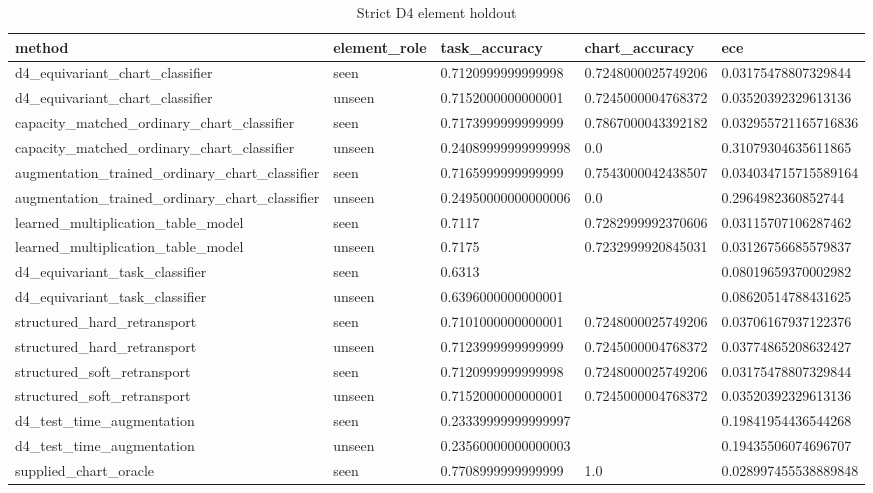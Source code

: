 \begin{table}[t]
\centering
\caption{Strict D4 element holdout}
\begin{tabular}{lllll}
\toprule
method & element\_role & task\_accuracy & chart\_accuracy & ece \\
\midrule
d4\_equivariant\_chart\_classifier & seen & 0.7120999999999998 & 0.7248000025749206 & 0.03175478807329844 \\
d4\_equivariant\_chart\_classifier & unseen & 0.7152000000000001 & 0.7245000004768372 & 0.03520392329613136 \\
capacity\_matched\_ordinary\_chart\_classifier & seen & 0.7173999999999999 & 0.7867000043392182 & 0.032955721165716836 \\
capacity\_matched\_ordinary\_chart\_classifier & unseen & 0.24089999999999998 & 0.0 & 0.31079304635611865 \\
augmentation\_trained\_ordinary\_chart\_classifier & seen & 0.7165999999999999 & 0.7543000042438507 & 0.034034715715589164 \\
augmentation\_trained\_ordinary\_chart\_classifier & unseen & 0.24950000000000006 & 0.0 & 0.2964982360852744 \\
learned\_multiplication\_table\_model & seen & 0.7117 & 0.7282999992370606 & 0.03115707106287462 \\
learned\_multiplication\_table\_model & unseen & 0.7175 & 0.7232999920845031 & 0.03126756685579837 \\
d4\_equivariant\_task\_classifier & seen & 0.6313 &  & 0.08019659370002982 \\
d4\_equivariant\_task\_classifier & unseen & 0.6396000000000001 &  & 0.08620514788431625 \\
structured\_hard\_retransport & seen & 0.7101000000000001 & 0.7248000025749206 & 0.03706167937122376 \\
structured\_hard\_retransport & unseen & 0.7123999999999999 & 0.7245000004768372 & 0.03774865208632427 \\
structured\_soft\_retransport & seen & 0.7120999999999998 & 0.7248000025749206 & 0.03175478807329844 \\
structured\_soft\_retransport & unseen & 0.7152000000000001 & 0.7245000004768372 & 0.03520392329613136 \\
d4\_test\_time\_augmentation & seen & 0.23339999999999997 &  & 0.19841954436544268 \\
d4\_test\_time\_augmentation & unseen & 0.23560000000000003 &  & 0.19435506074696707 \\
supplied\_chart\_oracle & seen & 0.7708999999999999 & 1.0 & 0.028997455538889848 \\

\end{tabular}
\end{table}
